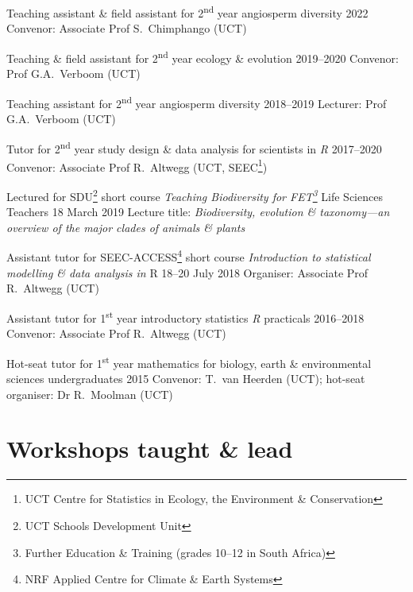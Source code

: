 \documentclass[10pt]{article}
\begin{document}
\begin{hangparas}{2em}{1}

Teaching assistant \& field assistant for 2\textsuperscript{nd} year angiosperm
diversity                                            \hfill 2022 \break
Convenor: Associate Prof S.~Chimphango (UCT)

Teaching \& field assistant for 2\textsuperscript{nd} year ecology \& evolution
                                               \hfill 2019--2020 \break
Convenor: Prof G.A.~Verboom (UCT)

Teaching assistant for 2\textsuperscript{nd} year angiosperm diversity
                                               \hfill 2018--2019 \break
Lecturer: Prof G.A.~Verboom (UCT)

Tutor for 2\textsuperscript{nd} year study design \& data analysis for 
scientists in \textit{R}                       \hfill 2017--2020 \break
Convenor: Associate Prof R.~Altwegg (UCT, SEEC\footnote{UCT Centre for 
Statistics in Ecology, the Environment \& Conservation})

Lectured for SDU\footnote{UCT Schools Development Unit} short course 
\textit{Teaching Biodiversity for FET\footnote{Further Education \& Training
(grades 10--12 in South Africa)}} Life Sciences Teachers
                                            \hfill 18 March 2019 \break
Lecture title: \textit{Biodiversity, evolution \& taxonomy---an overview of the 
major clades of animals \& plants}

Assistant tutor for SEEC-ACCESS\footnote{NRF Applied Centre for Climate \&
Earth Systems} short course \textit{Introduction to statistical modelling \& data 
analysis in} R                           \hfill 18--20 July 2018 \break
Organiser: Associate Prof R.~Altwegg (UCT)

Assistant tutor for 1\textsuperscript{st} year introductory statistics
\textit{R} practicals                          \hfill 2016--2018 \break
Convenor: Associate Prof R.~Altwegg (UCT)

Hot-seat tutor for 1\textsuperscript{st} year mathematics for biology, earth \& 
environmental sciences undergraduates                \hfill 2015 \break
Convenor: T.~van Heerden (UCT); hot-seat organiser: Dr R.~Moolman (UCT)

\hfill

\end{hangparas}

\section*{Workshops taught \& lead} %
\end{document}
